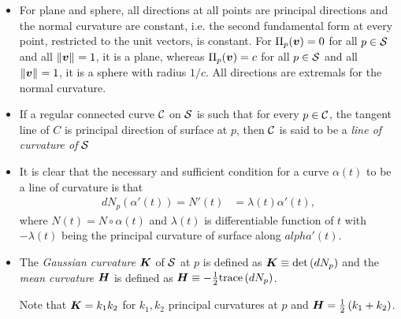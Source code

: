 \documentclass[11pt]{article}
\begin{document}
\begin{itemize}
\item  \begin{remark}
 For plane and sphere, all directions at all points are principal directions and the normal curvature are constant, i.e. the second fundamental form at every point, restricted to the unit vectors, is constant. For $\Pi_{p}(\boldsymbol{v}) = 0$ for all $p\in {\mathcal S}$ and all $\left\|\boldsymbol{v}\right\|_{} = 1$, it is a plane, whereas  $\Pi_{p}(\boldsymbol{v}) = c$ for all $p\in {\mathcal S}$ and all $\left\|\boldsymbol{v}\right\|_{} = 1$, it is a sphere with radius $1/c$. All directions are extremals for the normal curvature. 
 \end{remark}

\item  \begin{definition} 
If a regular connected curve ${\mathcal C}$ on ${\mathcal S}$ is such that for every $p\in {\mathcal C}$, the tangent line of $C$ is principal direction of surface at $p$, then ${\mathcal C}$ is said to be a \emph{line of curvature of} ${\mathcal S}$
\end{definition}


\item \begin{remark} It is clear that the necessary and sufficient condition for a curve $\alpha(t)$ to be a line of curvature is that
\begin{align*}
dN_{p}(\alpha'(t)) = N'(t) &= \lambda(t)\alpha'(t), 
\end{align*}where $N(t) = N\circ \alpha(t)$ and $
\lambda(t)$ is differentiable function of $t$ with $-\lambda(t)$ being the principal curvature of surface along $alpha'(t)$.\\
\end{remark}



\item \begin{definition}
The \emph{Gaussian curvature} $\boldsymbol{K}$ of ${\mathcal S}$ at $p$ is defined as $\boldsymbol{K}\equiv \det\left(dN_{p}\right)$ and the \emph{mean curvature} $\boldsymbol{H}$ is defined as $\boldsymbol{H}\equiv -\frac{1}{2}\text{trace}\left(dN_{p}\right)$. 

Note that $\boldsymbol{K} = k_{1}k_{2}$ for $k_{1}, k_{2}$ principal curvatures at $p$ and $\boldsymbol{H} = \frac{1}{2}\left(k_{1}+ k_{2}\right)$. \end{definition}


\end{itemize}
\end{document}
